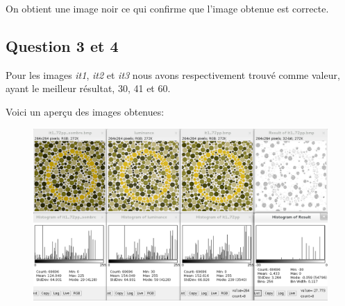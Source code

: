 \documentclass[a4paper,12pt]{report}
\begin{document}
On obtient une image noir ce qui confirme que l'image obtenue est correcte.

\newpage

\subsection*{Question 3 et 4}

Pour les images \textit{it1}, \textit{it2} et \textit{it3} nous avons respectivement trouvé comme valeur, ayant le meilleur résultat, 30, 41 et 60.

Voici un aperçu des images obtenues:

\begin{figure}[!ht]
	\center
	\includegraphics[scale=0.32]{image/q3-1.png}
\end{figure} 
\end{document}
